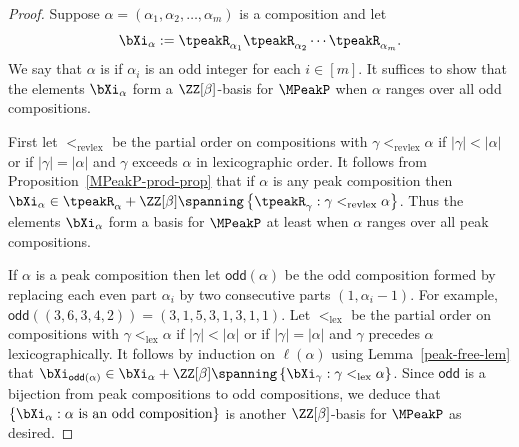 \begin{proof}
Suppose $\alpha=(\alpha_1,\alpha_2,\dots,\alpha_m)$ is a composition
and let \[\bXi_\alpha := \tpeakR_{\alpha_1}  \tpeakR_{\alpha_2} \cdots  \tpeakR_{\alpha_m}.\]
We say that $\alpha$ is  if $\alpha_i$ is an odd integer for each $i \in [m]$.
It suffices to show that the elements  $\bXi_\alpha$ form a $\ZZ[\beta]$-basis for $\MPeakP$ when $\alpha$ ranges over all odd compositions.
%

First let $<_{\mathrm{revlex}}$ be the partial order on compositions with $\gamma <_{\mathrm{revlex}} \alpha$ 
if $|\gamma| < |\alpha|$ or if $|\gamma| = |\alpha|$ and $\gamma$ exceeds $\alpha$ in lexicographic order.
It follows from Proposition~\ref{MPeakP-prod-prop}
that if $\alpha$ is any peak composition then $\bXi_\alpha \in \tpeakR_\alpha + \ZZ[\beta]\spanning\left\{ \tpeakR_\gamma : \gamma <_{\mathrm{revlex}} \alpha\right\}$.
Thus  the elements  $\bXi_\alpha$ form a basis for $\MPeakP$ at least when $\alpha$ ranges over all peak compositions.

If $\alpha$ is a peak composition then let $\mathsf{odd}(\alpha)$ be the odd composition formed by replacing 
each even part $\alpha_i$ by two consecutive parts $(1,\alpha_i-1)$. 
For example, $\mathsf{odd}((3,6,3,4,2)) = (3,1,5,3,1,3,1,1)$.
Let $<_{\mathrm{lex}}$ be the partial order on compositions with $\gamma <_{\mathrm{lex}} \alpha$ if $|\gamma| < |\alpha|$
or if $|\gamma| = |\alpha|$ and $\gamma$ precedes $\alpha$ lexicographically.
It follows by induction on $\ell(\alpha)$ using Lemma~\ref{peak-free-lem}
that
$\bXi_{\mathsf{odd}(\alpha)} \in \bXi_\alpha + \ZZ[\beta]\spanning\left\{ \bXi_\gamma : \gamma <_{\mathrm{lex}} \alpha\right\}$.
Since $\mathsf{odd}$ is a bijection from peak compositions to odd compositions,
we deduce that $\left\{\bXi_\alpha : \alpha\text{ is an odd composition}\right\}$
 is another $\ZZ[\beta]$-basis for $\MPeakP$ as desired.
\end{proof}
